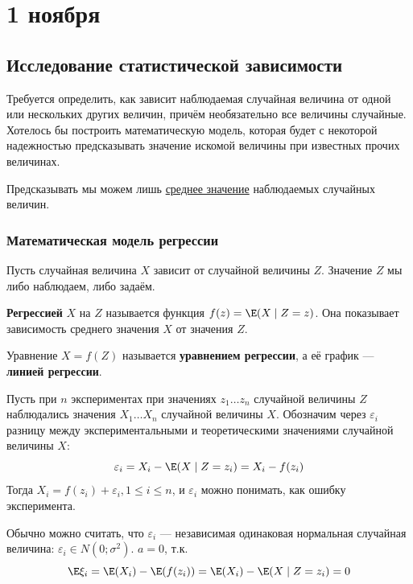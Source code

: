 \chapter{1 ноября}

\section{Исследование статистической зависимости}

Требуется определить, как зависит наблюдаемая случайная величина от одной или нескольких других величин, причём необязательно все величины случайные. Хотелось бы построить математическую модель, которая будет с некоторой надежностью предсказывать значение искомой величины при известных прочих величинах.

\begin{remark}
    Предсказывать мы можем лишь \underline{среднее значение} наблюдаемых случайных величин.
\end{remark}

\subsection{Математическая модель регрессии}

Пусть случайная величина \(X\) зависит от случайной величины \(Z\). Значение \(Z\) мы либо наблюдаем, либо задаём.

\begin{definition}
    \textbf{Регрессией} \(X\) на \(Z\) называется функция \(f(z) = \E (X \mid Z = z)\). Она показывает зависимость среднего значения \(X\) от значения \(Z\).
\end{definition}

\begin{definition}
    Уравнение \(X = f(Z)\) называется \textbf{уравнением регрессии}, а её график --- \textbf{линией регрессии}.
\end{definition}

Пусть при \(n\) экспериментах при значениях \(z_1 \dots z_n\) случайной величины \(Z\) наблюдались значения \(X_1 \dots X_n\) случайной величины \(X\). Обозначим через \(\varepsilon_i\) разницу между экспериментальными и теоретическими значениями случайной величины \(X\):
\[\varepsilon_i = X_i - \E(X \mid Z = z_i) = X_i - f(z_i)\]
Тогда \(X_i = f(z_i) + \varepsilon_i, 1 \leq i \leq n\), и \(\varepsilon_i\) можно понимать, как ошибку эксперимента.

\begin{remark}
    Обычно можно считать, что \(\varepsilon_i\) --- независимая одинаковая нормальная случайная величина: \(\varepsilon_i \in N(0; \sigma^2)\). \(a = 0\), т.к.
    \[\E \xi_i = \E (X_i) - \E(f(z_i)) = \E (X_i) - \E(X \mid Z = z_i) = 0\]
\end{remark}

